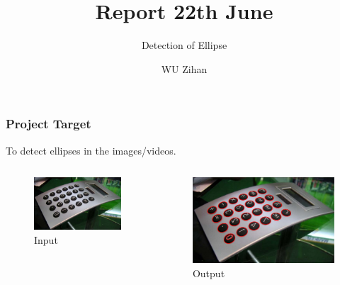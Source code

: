 \documentclass{beamer}
\title{Report 22th June}
\author{WU Zihan}
\subtitle{Detection of Ellipse}
\begin{document}
    \maketitle
    \begin{frame}
        \frametitle{Project Target}
    
        To detect ellipses in the images/videos.
        \begin{columns}
            \begin{column}{.5\linewidth}
                \begin{figure}
                    \includegraphics[width=0.8\linewidth]{pic/source.jpg}
                    \caption{Input}
                \end{figure}
            \end{column}
            \begin{column}{.5\linewidth}
                \begin{figure}
                    \includegraphics[width=0.8\linewidth]{pic/ideaoutput.jpg}
                    \caption{Output}
                \end{figure}
            \end{column}
        \end{columns}
    
    \end{frame}
\end{document}
